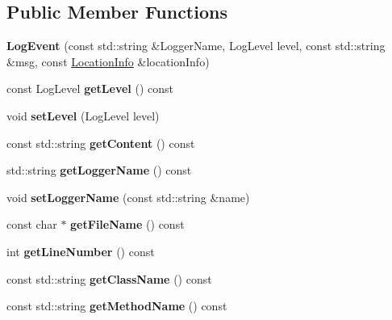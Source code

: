 \subsection*{Public Member Functions}
\begin{DoxyCompactItemize}
\item 
\mbox{\label{classDAQ_1_1LogEvent_aca7995ace3b3eb60f1252283c43e046b}} 
{\bfseries Log\+Event} (const std\+::string \&Logger\+Name, Log\+Level level, const std\+::string \&msg, const \hyperlink{classDAQ_1_1LocationInfo}{Location\+Info} \&location\+Info)
\item 
\mbox{\label{classDAQ_1_1LogEvent_aa69a6ebfd130a5a8c87e72e550072a9f}} 
const Log\+Level {\bfseries get\+Level} () const
\item 
\mbox{\label{classDAQ_1_1LogEvent_abf856c9bc83c9685d524adb2b7570748}} 
void {\bfseries set\+Level} (Log\+Level level)
\item 
\mbox{\label{classDAQ_1_1LogEvent_a598685e5c1cade8cd7c1322ec0a015bc}} 
const std\+::string {\bfseries get\+Content} () const
\item 
\mbox{\label{classDAQ_1_1LogEvent_a7b140f348c774eb9133f522ac2cf42f1}} 
std\+::string {\bfseries get\+Logger\+Name} () const
\item 
\mbox{\label{classDAQ_1_1LogEvent_ab695adedb096d9f7af1ca5f6e8c92c1f}} 
void {\bfseries set\+Logger\+Name} (const std\+::string \&name)
\item 
\mbox{\label{classDAQ_1_1LogEvent_a999c77ea8219de879bbe75774cdfa203}} 
const char $\ast$ {\bfseries get\+File\+Name} () const
\item 
\mbox{\label{classDAQ_1_1LogEvent_a7c2b4dd5a8bcf4e5f38ee21c67c37e81}} 
int {\bfseries get\+Line\+Number} () const
\item 
\mbox{\label{classDAQ_1_1LogEvent_a6cd4154f9a36173b2c10a6722c6763a3}} 
const std\+::string {\bfseries get\+Class\+Name} () const
\item 
\mbox{\label{classDAQ_1_1LogEvent_a765b3507bc666f31c42308c9185ee374}} 
const std\+::string {\bfseries get\+Method\+Name} () const
\end{DoxyCompactItemize}
